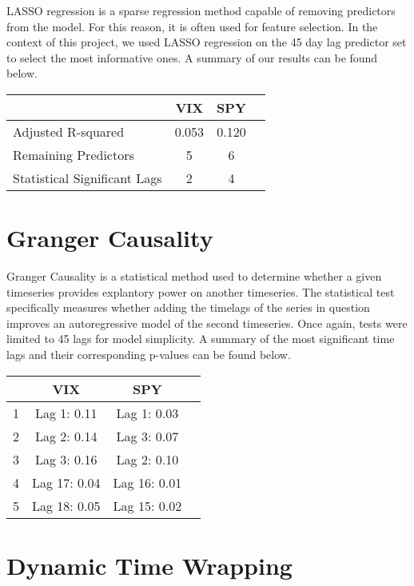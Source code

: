 \documentclass{article}
\begin{document}
LASSO regression is a sparse regression method capable of removing predictors from the model. For this reason, it is often used for feature selection. In the context of this project, we used LASSO regression on the 45 day lag predictor set to select the most informative ones. A summary of our results can be found below. 


\begin{table}[h]
    \centering
\begin{tabular}{l||ccc}
    \toprule
     & \textbf{VIX} & \textbf{SPY} & \\
    \midrule
    Adjusted R-squared & 0.053 & 0.120 \\
    Remaining Predictors & 5 & 6\\
    Statistical Significant Lags & 2 & 4\\
    \bottomrule
\end{tabular}
\end{table}

\section*{Granger Causality}

Granger Causality is a statistical method used to determine whether a given timeseries provides explantory power on another timeseries. The statistical test specifically measures whether adding the timelags of the series in question improves an autoregressive model of the second timeseries. Once again, tests were limited to 45 lags for model simplicity. A summary of the most significant time lags and their corresponding p-values can be found below. 

\begin{table}[h]
    \centering
\begin{tabular}{l||ccc}
    \toprule
     & \textbf{VIX} & \textbf{SPY} & \\
    \midrule
    1 & Lag 1: 0.11 & Lag 1: 0.03 \\
    2 & Lag 2: 0.14 & Lag 3: 0.07\\
    3 & Lag 3: 0.16 & Lag 2: 0.10\\
    4 & Lag 17: 0.04 & Lag 16: 0.01\\
    5 & Lag 18: 0.05 & Lag 15: 0.02\\
    \bottomrule
\end{tabular}
\end{table}

\newpage
\section*{Dynamic Time Wrapping}
\end{document}
